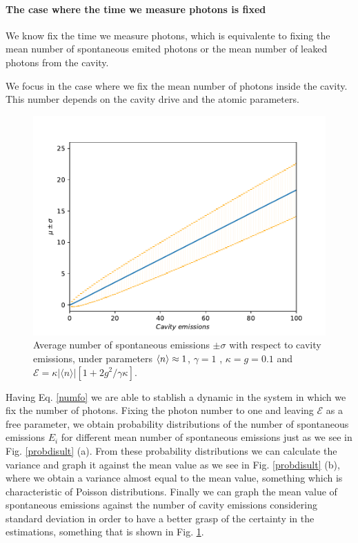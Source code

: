 \documentclass[conference]{IEEEtran}
\begin{document}
\paragraph{The case where the time we measure photons is fixed}

We know fix the time we measure photons, which is equivalente to
fixing the mean number of spontaneous emited photons or the mean number
of leaked photons from the cavity. 

We focus in the case where we fix the mean number of photons inside
the cavity. This number depends on the cavity drive and the atomic
parameters.

\begin{figure}[!t]  
\centering
\includegraphics[scale = 0.45]{newsigmaeng.pdf}
\caption{\small{Average number of spontaneous emissions $\pm \sigma$ with respect to cavity emissions, under parameters $\expval{n} \approx 1$, $\gamma = 1$ , $\kappa = g = 0.1$ and $\mathcal{E} =  \kappa |\langle n \rangle|[1 + 2g^2/\gamma \kappa]$.}}
\label{graph}
\end{figure} 
Having Eq. \eqref{numfo} we are able to stablish a dynamic in the system in which we fix the number of photons. Fixing the photon number to one and leaving $\mathcal{E}$ as a free parameter, we obtain probability distributions of the number of spontaneous emissions $E_i$ for different mean number of spontaneous emissions just as we see in Fig. \ref{probdisult} (a). From these probability distributions we can calculate the variance and graph it against the mean value as we see in Fig. \ref{probdisult} (b), where we obtain a variance almost equal to the mean value, something which is characteristic of Poisson distributions. 
Finally we can graph the mean value of spontaneous emissions against the number of cavity emissions considering standard deviation in order to have a better grasp of the certainty in the estimations, something that is shown in Fig. \ref{graph}.
\end{document}
